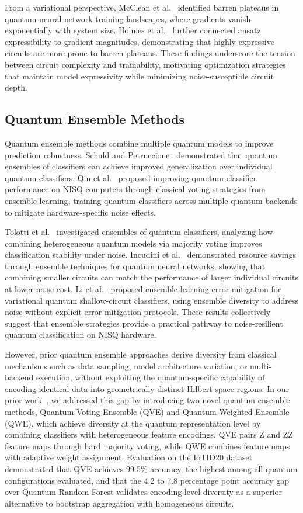 \documentclass{ieeeaccess}
\begin{document}
From a variational perspective, McClean et al.~\cite{McClean2018} identified barren plateaus in quantum neural network training landscapes, where gradients vanish exponentially with system size. Holmes et al.~\cite{Holmes2022} further connected ansatz expressibility to gradient magnitudes, demonstrating that highly expressive circuits are more prone to barren plateaus. These findings underscore the tension between circuit complexity and trainability, motivating optimization strategies that maintain model expressivity while minimizing noise-susceptible circuit depth.

\subsection{Quantum Ensemble Methods}
\label{sec:rw_ensembles}

Quantum ensemble methods combine multiple quantum models to improve prediction robustness. Schuld and Petruccione~\cite{Schuld2018Ensemble} demonstrated that quantum ensembles of classifiers can achieve improved generalization over individual quantum classifiers. Qin et al.~\cite{Qin2022} proposed improving quantum classifier performance on NISQ computers through classical voting strategies from ensemble learning, training quantum classifiers across multiple quantum backends to mitigate hardware-specific noise effects.

Tolotti et al.~\cite{Tolotti2023} investigated ensembles of quantum classifiers, analyzing how combining heterogeneous quantum models via majority voting improves classification stability under noise. Incudini et al.~\cite{Incudini2023} demonstrated resource savings through ensemble techniques for quantum neural networks, showing that combining smaller circuits can match the performance of larger individual circuits at lower noise cost. Li et al.~\cite{Li2024ensemble} proposed ensemble-learning error mitigation for variational quantum shallow-circuit classifiers, using ensemble diversity to address noise without explicit error mitigation protocols. These results collectively suggest that ensemble strategies provide a practical pathway to noise-resilient quantum classification on NISQ hardware.

However, prior quantum ensemble approaches derive diversity from classical mechanisms such as data sampling, model architecture variation, or multi-backend execution, without exploiting the quantum-specific capability of encoding identical data into geometrically distinct Hilbert space regions. In our prior work~\cite{AuthorQVEQWE2025}, we addressed this gap by introducing two novel quantum ensemble methods, Quantum Voting Ensemble (QVE) and Quantum Weighted Ensemble (QWE), which achieve diversity at the quantum representation level by combining classifiers with heterogeneous feature encodings. QVE pairs Z and ZZ feature maps through hard majority voting, while QWE combines feature maps with adaptive weight assignment. Evaluation on the IoTID20 dataset demonstrated that QVE achieves 99.5\% accuracy, the highest among all quantum configurations evaluated, and that the 4.2 to 7.8 percentage point accuracy gap over Quantum Random Forest validates encoding-level diversity as a superior alternative to bootstrap aggregation with homogeneous circuits.
\end{document}
